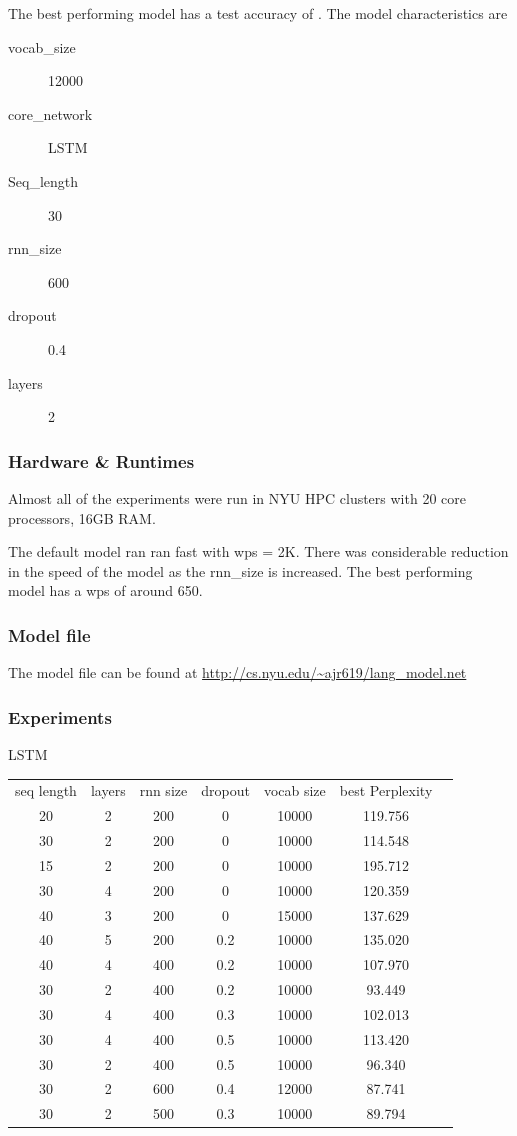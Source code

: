 \documentclass{article}
\begin{document}
The best performing model has a test accuracy of \textbf{}.  The model characteristics are
\begin{description}
  \item[vocab\_size] 12000
  \item[core\_network] LSTM
  \item[Seq\_length] 30
  \item[rnn\_size] 600
  \item[dropout] 0.4
  \item[layers] 2
\end{description}


\subsubsection{Hardware \& Runtimes}
Almost all of the experiments were run in NYU HPC clusters with 20 core processors, 16GB RAM\@.

The default model ran ran fast with wps = 2K. There was considerable reduction in the speed of the model as the rnn\_size is increased. The best performing model has a wps of around 650.

\subsubsection{Model file}
The model file can be found at \url{http://cs.nyu.edu/~ajr619/lang\_model.net}

\subsubsection{Experiments}
LSTM
\begin{center}
\begin{tabular}{c c c c c c c} 
seq length & layers & rnn size & dropout  & vocab size & best Perplexity\\
 20 & 2 & 200 & 0 &  10000 & 119.756\\ 
 30 & 2 & 200 & 0 &  10000 & 114.548\\ 
 15 & 2 & 200 & 0 &  10000 & 195.712\\ 
  30 & 4 & 200 & 0 & 10000 & 120.359\\
  40 & 3 & 200 & 0 & 15000 & 137.629\\
 40 & 5 & 200 & 0.2 & 10000 & 135.020\\
 40 & 4 & 400 & 0.2 & 10000 & 107.970\\
 30 & 2 & 400 & 0.2 & 10000 & 93.449\\
 30 & 4 & 400 & 0.3 & 10000 & 102.013\\
  30 & 4 & 400 & 0.5 & 10000 & 113.420\\
  
  30 & 2 & 400 & 0.5 &  10000 & 96.340\\
  30 & 2 & 600 & 0.4 &  12000 & 87.741\\  
  30 & 2 & 500 & 0.3 &  10000 & 89.794\\  
   
\end{tabular}
\end{center}
\end{document}
